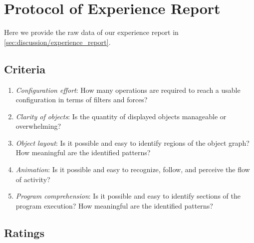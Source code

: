 \section{Protocol of Experience Report}
\label{sec:appendix/experience_report}

Here we provide the raw data of our experience report in \autoref{sec:discussion/experience_report}.

\subsection{Criteria}

\begin{enumerate}
	\item \emph{Configuration effort}: How many operations are required to reach a usable configuration in terms of filters and forces?
	\item \emph{Clarity of objects}: Is the quantity of displayed objects manageable or overwhelming?
	\item \emph{Object layout}: Is it possible and easy to identify regions of the object graph? How meaningful are the identified patterns?
	\item \emph{Animation}: Is it possible and easy to recognize, follow, and perceive the flow of activity?
	\item \emph{Program comprehension}: Is it possible and easy to identify sections of the program execution? How meaningful are the identified patterns?
\end{enumerate}


\subsection{Ratings}

